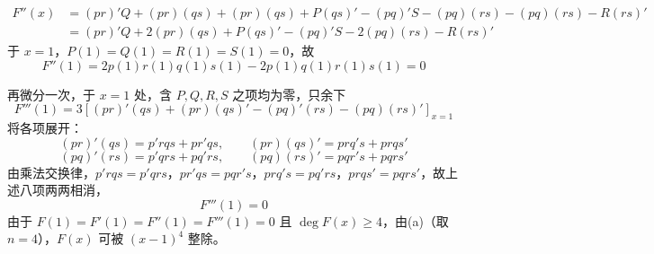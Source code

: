 \begin{questions}
\begin{parts}
\begin{solution}
\begin{align*}
F''(x) &= (pr)'Q+(pr)(qs)+(pr)(qs)+P(qs)'-(pq)'S-(pq)(rs)-(pq)(rs)-R(rs)' \\
&= (pr)'Q+2(pr)(qs)+P(qs)'-(pq)'S-2(pq)(rs)-R(rs)'
\end{align*}
于 $x=1$，$P(1)=Q(1)=R(1)=S(1)=0$，故
\[
F''(1) = 2p(1)r(1)q(1)s(1)-2p(1)q(1)r(1)s(1) = 0
\]

再微分一次，于 $x=1$ 处，含 $P,Q,R,S$ 之项均为零，只余下
\[
F'''(1) = 3\left[(pr)'(qs)+(pr)(qs)'-(pq)'(rs)-(pq)(rs)'\right]_{x=1}
\]
将各项展开：
\[
(pr)'(qs) = p'rqs+pr'qs , \qquad (pr)(qs)' = prq's+prqs'
\]
\[
(pq)'(rs) = p'qrs+pq'rs , \qquad (pq)(rs)' = pqr's+pqrs'
\]
由乘法交换律，$p'rqs=p'qrs$，$pr'qs=pqr's$，$prq's=pq'rs$，$prqs'=pqrs'$，故上述八项两两相消，
\[
F'''(1) = 0
\]
由于 $F(1)=F'(1)=F''(1)=F'''(1)=0$ 且 $\deg F(x)\ge 4$，由(a)（取 $n=4$），$F(x)$ 可被 $(x-1)^4$ 整除。
\end{solution}
\end{parts}

\question
{}
\end{questions}
